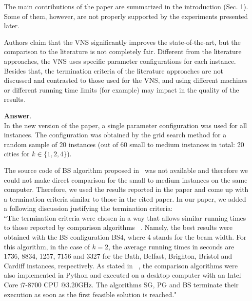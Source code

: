 \documentclass [11pt]{scrartcl}
\begin{document}
\begin{leftbar}
  
The main contributions of the paper are summarized in the introduction (Sec. 1). Some of them, however, are not properly supported by the experiments presented later.
\end{leftbar}
\begin{enumerate}
	\textbf{Answer}. \\
	In the new version of the paper, a single parameter configuration was used for all instances. The configuration was obtained by the grid search method for a random sample of 20 instances (out of 60 small to medium instances in total: 20 cities for $k \in \{1,2,4\}$).
	
	The source code of BS algorithm proposed in~\cite{corcoran2021heuristics} was not available and therefore we could not make direct comparison for the small to medium instances on the same computer. Therefore, we used the results reported in the paper and come up with a termination criteria similar to those in the cited paper. 
	In our paper, we added a following discussion justifying the termination criteria:\\
	``The termination criteria were chosen in a way that allows similar running times to those reported by comparison algorithms ~\cite{corcoran2021heuristics}. Namely, the best results were obtained with the BS configuration BS4, where 4 stands for the beam width. For this algorithm, in the case of $k=2$, the average running times in seconds are 1736, 8834, 1257, 7156 and 3327 for the Bath, Belfast, Brighton, Bristol and Cardiff instances, respectively. As stated in ~\cite{corcoran2021heuristics}, the comparison algorithms were also implemented in  Python and executed on a desktop computer with an Intel Core i7-8700 CPU @3.20GHz. The algorithms SG, PG and BS terminate their execution as soon as the first feasible solution is reached."
	

\end{enumerate}
\end{document}
